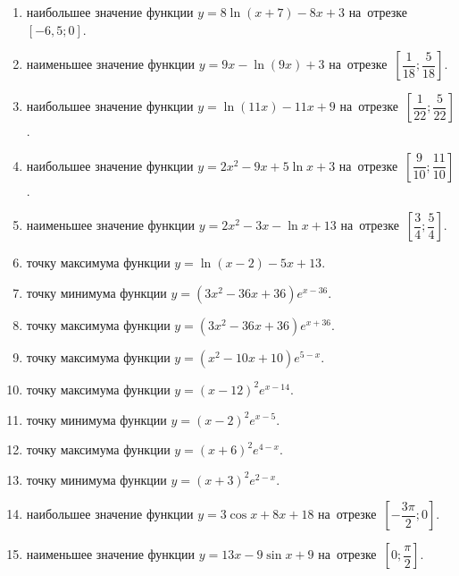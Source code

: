 \documentclass[a4paper,10pt]{article}
\begin{document}
\begin{enumerate}
\item {} наибольшее значение функции $y=8\ln \left(x+7\right)-8x+3$ на~отрезке~$\left[-6,5;0\right]$.

\item {} наименьшее значение функции $y=9x-\ln \left(9x\right)+3$ на~отрезке~$\left[\dfrac{1}{18};\dfrac{5}{18}\right]$.

\item {} наибольшее значение функции $y=\ln \left(11x\right)-11x+9$ на~отрезке~$\left[\dfrac{1}{22};\dfrac{5}{22}\right]$.

\item {} наибольшее значение функции $y=2x^2-9x+5\ln x+3$ на~отрезке~$\left[\dfrac{9}{10};\dfrac{11}{10}\right]$.

\item {} наименьшее значение функции $y=2x^2-3x-\ln x+13$ на~отрезке~$\left[\dfrac{3}{4};\dfrac{5}{4}\right]$.

\item {} точку максимума функции $y=\ln \left(x-2\right)-5x+13$.

\item {} точку минимума функции $y=\left(3x^2-36x+36\right)e^{x-36}$.

\item {} точку максимума функции $y=\left(3x^2-36x+36\right)e^{x+36}$.

\item {} точку максимума функции $y=\left(x^2-10x+10\right)e^{5-x}$.

\item {} точку максимума функции $y=\left(x -12\right)^2e^{x-14}$.

\item {} точку минимума функции $y=\left(x-2\right)^2e^{x-5}$.

\item {} точку максимума функции $y=\left(x+6\right)^2e^{4-x}$.

\item {} точку минимума функции $y=\left(x+3\right)^2e^{2-x}$.

\item {} наибольшее значение функции $y=3\cos x+8x +18$ на~отрезке~$\left[-\dfrac{3\pi }{2};0\right]$.

\item {} наименьшее значение функции $y=13x-9\sin x+9$ на~отрезке~$\left[0;\dfrac{\pi }{2}\right]$.


\end{enumerate}
\end{document}

